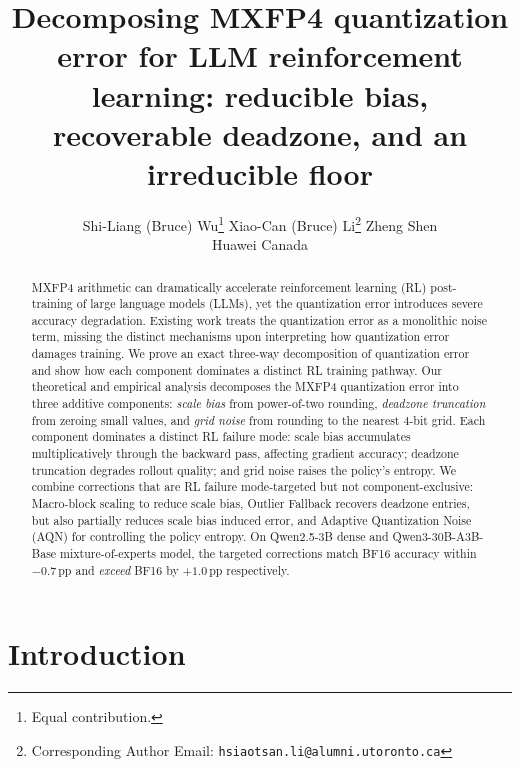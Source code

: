 \documentclass{article}
\title{Decomposing MXFP4 quantization error for LLM reinforcement learning: reducible bias, recoverable deadzone, and an irreducible floor}
\author{%
  Shi-Liang (Bruce) Wu\thanks{Equal contribution.} \quad
  Xiao-Can (Bruce) Li\footnotemark[1]\hspace{0.5em}\thanks{Corresponding Author Email: \texttt{hsiaotsan.li@alumni.utoronto.ca}} \quad
  Zheng Shen \\
  Huawei Canada
}
\theoremstyle{definition}
\theoremstyle{remark}
\begin{document}
\maketitle

\begin{abstract}
MXFP4 arithmetic can dramatically accelerate reinforcement learning (RL) post-training of large language models (LLMs), yet the quantization error introduces severe accuracy degradation. Existing work treats the quantization error as a monolithic noise term, missing the distinct mechanisms upon interpreting how quantization error damages training. We prove an exact three-way  decomposition of quantization error and show how each component dominates a distinct RL training pathway. Our theoretical and empirical analysis decomposes the MXFP4 quantization error into three additive components: \emph{scale bias} from power-of-two rounding, \emph{deadzone truncation} from zeroing small values, and \emph{grid noise} from rounding to the nearest 4-bit grid. 
Each component dominates a distinct RL failure mode: scale bias accumulates multiplicatively through the backward pass, affecting gradient accuracy; deadzone truncation degrades rollout quality; and grid noise raises the policy's entropy. We combine corrections that are RL failure mode-targeted but not component-exclusive: Macro-block scaling to reduce scale bias, Outlier Fallback  recovers deadzone entries, but also partially reduces scale bias induced error, and Adaptive Quantization Noise (AQN) for controlling the policy entropy.
 On Qwen2.5-3B dense and Qwen3-30B-A3B-Base mixture-of-experts model, the targeted corrections match BF16 accuracy within $-0.7$\,pp and \emph{exceed} BF16 by $+1.0$\,pp respectively.
\end{abstract}

\section{Introduction}
\label{sec:intro}
\end{document}
